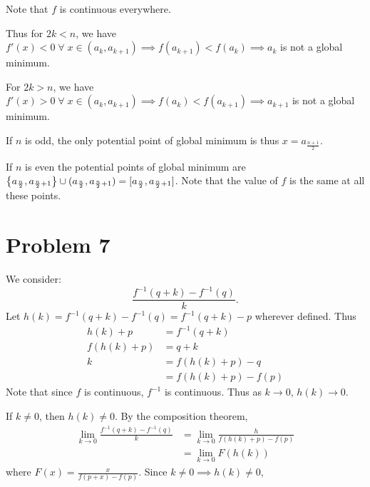 \documentclass[12pt]{article}
\begin{document}
Note that $f$ is continuous everywhere.

Thus for $2k < n$, we have $f'(x) < 0 \;\forall\; x \in (a_{k}, a_{k + 1}) \implies f(a_{k + 1}) < f(a_{k}) \implies a_{k}$ is not a global minimum.

For $2k > n$, we have $f'(x) > 0 \;\forall\; x \in (a_{k}, a_{k+1}) \implies f(a_{k}) < f(a_{k + 1}) \implies a_{k+1}$ is not a global minimum.

If $n$ is odd, the only potential point of global minimum is thus $x = a_{\frac{n + 1}{2}}$.

If $n$ is even the potential points of global minimum are $\set{a_{\frac{n}{2}}, a_{\frac{n}{2} + 1}} \cup (a_{\frac{n}{2}}, a_{\frac{n}{2} + 1}) = [a_{\frac{n}{2}}, a_{\frac{n}{2} + 1}]$.
Note that the value of $f$ is the same at all these points.

\section*{Problem 7}
We consider: \[
    \frac{f^{-1}(q + k) - f^{-1}(q)}{k}.
\] Let $h(k) = f^{-1}(q + k) - f^{-1}(q) = f^{-1}(q + k) - p$ wherever defined. Thus
\begin{align*}
    h(k) + p &= f^{-1}(q + k) \\
    f(h(k) + p) &= q + k \\
    k &= f(h(k) + p) - q \\
    &= f(h(k) + p) - f(p)
\end{align*}
Note that since $f$ is continuous, $f^{-1}$ is continuous.
Thus as $k \to 0$, $h(k) \to 0$.

If $k \neq 0$, then $h(k) \neq 0$. By the composition theorem,
\begin{align*}
    \lim_{k \to 0} \frac{f^{-1}(q + k) - f^{-1}(q)}{k} &= \lim_{k \to 0} \frac{h}{f(h(k) + p) - f(p)} \\
    &= \lim_{k \to 0} F(h(k))
\end{align*}
where $F(x) = \frac{x}{f(p + x) - f(p)}$. Since $k \neq 0 \implies h(k) \neq 0$,
\end{document}
